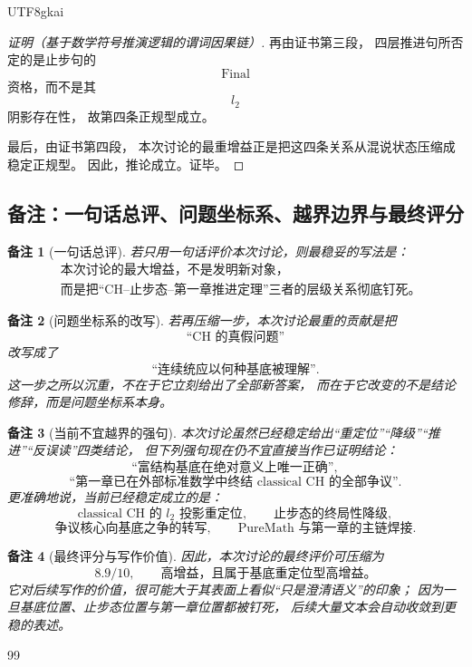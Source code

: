 \documentclass[12pt]{article}
\newtheorem{remark}{备注}[section]
\newcommand{\Final}{\operatorname{Final}}
\begin{document}
\begin{CJK*}{UTF8}{gkai}
\begin{proof}[证明（基于数学符号推演逻辑的谓词因果链）]
再由证书第三段，
四层推进句所否定的是止步句的
\[
  \Final
\]
资格，而不是其
\[
  l_2
\]
阴影存在性，
故第四条正规型成立。

最后，由证书第四段，
本次讨论的最重增益正是把这四条关系从混说状态压缩成稳定正规型。
因此，推论成立。证毕。
\end{proof}

\subsection{备注：一句话总评、问题坐标系、越界边界与最终评分}
\label{subsec:tex41-ch2-remarks}

\begin{remark}[一句话总评]
若只用一句话评价本次讨论，则最稳妥的写法是：
\[
\boxed{
  \begin{aligned}
    &\text{本次讨论的最大增益，不是发明新对象，}\\
    &\text{而是把“CH--止步态--第一章推进定理”三者的层级关系彻底钉死。}
  \end{aligned}
}
\]
\end{remark}

\begin{remark}[问题坐标系的改写]
若再压缩一步，本次讨论最重的贡献是把
\[
  \text{“CH 的真假问题”}
\]
改写成了
\[
  \text{“连续统应以何种基底被理解”}.
\]
这一步之所以沉重，不在于它立刻给出了全部新答案，
而在于它改变的不是结论修辞，而是问题坐标系本身。
\end{remark}

\begin{remark}[当前不宜越界的强句]
本次讨论虽然已经稳定给出“重定位”“降级”“推进”“反误读”四类结论，
但下列强句现在仍不宜直接当作已证明结论：
\[
  \text{“富结构基底在绝对意义上唯一正确”},
\]
\[
  \text{“第一章已在外部标准数学中终结 classical CH 的全部争议”}.
\]
更准确地说，当前已经稳定成立的是：
\[
  \text{classical CH 的 }l_2\text{ 投影重定位},
  \qquad
  \text{止步态的终局性降级},
\]
\[
  \text{争议核心向基底之争的转写},
  \qquad
  \text{PureMath 与第一章的主链焊接}.
\]
\end{remark}

\begin{remark}[最终评分与写作价值]
因此，本次讨论的最终评价可压缩为
\[
\boxed{
  8.9/10,\qquad
  \text{高增益，且属于基底重定位型高增益。}
}
\]
它对后续写作的价值，很可能大于其表面上看似“只是澄清语义”的印象；
因为一旦基底位置、止步态位置与第一章位置都被钉死，
后续大量文本会自动收敛到更稳的表述。
\end{remark}

\clearpage
\begin{thebibliography}{99}


\end{thebibliography}
\end{CJK*}
\end{document}
